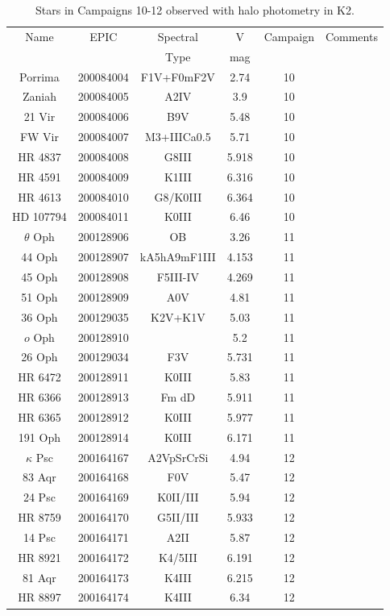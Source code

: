 \begin{table*}
\caption{Stars in Campaigns 10-12 observed with halo photometry in K2.\label{table_2}}
\begin{tabular}{cccccc}
\hline \hline
Name & EPIC & Spectral & V & Campaign & Comments \\
 &  & Type & mag &  &  \\
\hline
Porrima & 200084004 & F1V+F0mF2V & 2.74 & 10 &  \\
Zaniah & 200084005 & A2IV & 3.9 & 10 &  \\
21 Vir & 200084006 & B9V & 5.48 & 10 &  \\
FW Vir & 200084007 & M3+IIICa0.5 & 5.71 & 10 &  \\
HR 4837 & 200084008 & G8III & 5.918 & 10 &  \\
HR 4591 & 200084009 & K1III & 6.316 & 10 &  \\
HR 4613 & 200084010 & G8/K0III & 6.364 & 10 &  \\
HD 107794 & 200084011 & K0III & 6.46 & 10 &  \\
$\theta$ Oph & 200128906 & OB & 3.26 & 11 &  \\
44 Oph & 200128907 & kA5hA9mF1III & 4.153 & 11 &  \\
45 Oph & 200128908 & F5III-IV & 4.269 & 11 &  \\
51 Oph & 200128909 & A0V & 4.81 & 11 &  \\
36 Oph & 200129035 & K2V+K1V & 5.03 & 11 &  \\
$o$ Oph & 200128910 &  & 5.2 & 11 &  \\
26 Oph & 200129034 & F3V & 5.731 & 11 &  \\
HR 6472 & 200128911 & K0III & 5.83 & 11 &  \\
HR 6366 & 200128913 & Fm dD & 5.911 & 11 &  \\
HR 6365 & 200128912 & K0III & 5.977 & 11 &  \\
191 Oph & 200128914 & K0III & 6.171 & 11 &  \\
$\kappa$ Psc & 200164167 & A2VpSrCrSi & 4.94 & 12 &  \\
83 Aqr & 200164168 & F0V & 5.47 & 12 &  \\
24 Psc & 200164169 & K0II/III & 5.94 & 12 &  \\
HR 8759 & 200164170 & G5II/III & 5.933 & 12 &  \\
14 Psc & 200164171 & A2II & 5.87 & 12 &  \\
HR 8921 & 200164172 & K4/5III & 6.191 & 12 &  \\
81 Aqr & 200164173 & K4III & 6.215 & 12 &  \\
HR 8897 & 200164174 & K4III & 6.34 & 12 &  \\
\hline
\end{tabular}
\end{table*}
